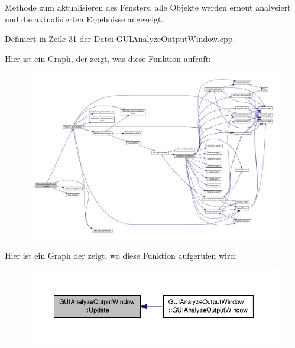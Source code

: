 Methode zum aktualisieren des Fensters, alle Objekte werden erneut analysiert und die aktualisierten Ergebnisse angezeigt. 



Definiert in Zeile 31 der Datei G\-U\-I\-Analyze\-Output\-Window.\-cpp.



Hier ist ein Graph, der zeigt, was diese Funktion aufruft\-:
\nopagebreak
\begin{figure}[H]
\begin{center}
\leavevmode
\includegraphics[width=350pt]{classGUIAnalyzeOutputWindow_a9ea5a7cf46d6189f368315903508cecc_cgraph}
\end{center}
\end{figure}




Hier ist ein Graph der zeigt, wo diese Funktion aufgerufen wird\-:\nopagebreak
\begin{figure}[H]
\begin{center}
\leavevmode
\includegraphics[width=350pt]{classGUIAnalyzeOutputWindow_a9ea5a7cf46d6189f368315903508cecc_icgraph}
\end{center}
\end{figure}




